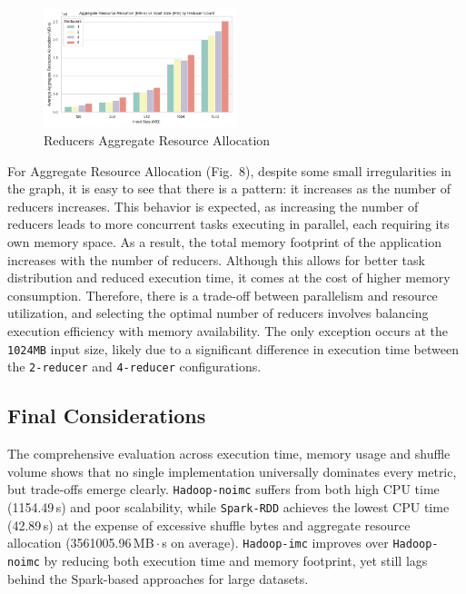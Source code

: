\begin{figure}[H]
	\centering
	\includegraphics[width=0.5\textwidth]{images/Fig_Reducers_Aggregate_Resource_Allocation.png}
	\caption{Reducers Aggregate Resource Allocation}
	\label{fig:reducer-aggregate-resource-allocation}
\end{figure}

For Aggregate Resource Allocation (Fig.~8), despite some small irregularities in the graph, it is easy to see that there is a pattern: it increases as the number of reducers increases. This behavior is expected, as increasing the number of reducers leads to more concurrent tasks executing in parallel, each requiring its own memory space. As a result, the total memory footprint of the application increases with the number of reducers. Although this allows for better task distribution and reduced execution time, it comes at the cost of higher memory consumption. Therefore, there is a trade-off between parallelism and resource utilization, and selecting the optimal number of reducers involves balancing execution efficiency with memory availability. The only exception occurs at the \texttt{1024MB} input size, likely due to a significant difference in execution time between the \texttt{2-reducer} and \texttt{4-reducer} configurations. 


\subsection{Final Considerations}
The comprehensive evaluation across execution time, memory usage and shuffle volume shows that no single implementation universally dominates every metric, but trade‑offs emerge clearly. \texttt{Hadoop-noimc} suffers from both high CPU time (1154.49\,s) and poor scalability, while \texttt{Spark-RDD} achieves the lowest CPU time (42.89\,s) at the expense of excessive shuffle bytes and aggregate resource allocation (3561005.96\,MB\,$\cdot$\,s on average). \texttt{Hadoop-imc} improves over \texttt{Hadoop-noimc} by reducing both execution time and memory footprint, yet still lags behind the Spark-based approaches for large datasets.

